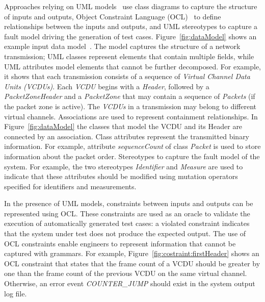Approaches relying on UML models~\cite{di2015evolutionary} use class diagrams to capture the structure of inputs and outputs, Object Constraint Language (OCL)~\cite{OCL} to define relationships between the inputs and outputs, and UML stereotypes to capture a fault model driving the generation of test cases.
Figure~\ref{fig:dataModel} shows an example input data model~\cite{di2015evolutionary}.
The model captures the structure of a network transmission; UML classes represent elements that contain multiple fields, while UML attributes model elements that cannot be further decomposed. For example, it shows that each transmission consists of a sequence of \emph{Virtual Channel Data Units (VCDUs)}. Each \emph{VCDU} begins with a \emph{Header}, followed by a \emph{PacketZoneHeader} and a \emph{PacketZone} that may contain a sequence of \emph{Packets} (if the packet zone is active).
The \emph{VCDUs} in a transmission may belong to different virtual channels.
Associations are used to represent containment relationships. In Figure~\ref{fig:dataModel} the classes that model the VCDU and its Header are connected by an association.
Class attributes represent the transmitted binary information. For example, attribute \emph{sequenceCount} of class \emph{Packet} is used to store information about the packet order.
Stereotypes to capture the fault model of the system. 
For example, 
the two stereotypes \emph{Identifier} and \emph{Measure} are used to indicate that these attributes should be modified using mutation operators specified for identifiers and measurements.


In the presence of UML models, constraints between inputs and outputs can be represented using OCL.
These constraints are used as an oracle to validate the execution of automatically generated test cases: a violated constraint indicates that the system under test does not produce the expected output. 
The use of OCL constraints enable engineers to represent information that cannot be captured with grammars.
For example, Figure~\ref{fig:costraint:firstHeader} shows an OCL constraint that states that the frame count of a VCDU should be greater by one than the frame count of the previous VCDU on the same virtual channel. Otherwise, an error event \emph{COUNTER\_JUMP} should exist in the system output log file. 

